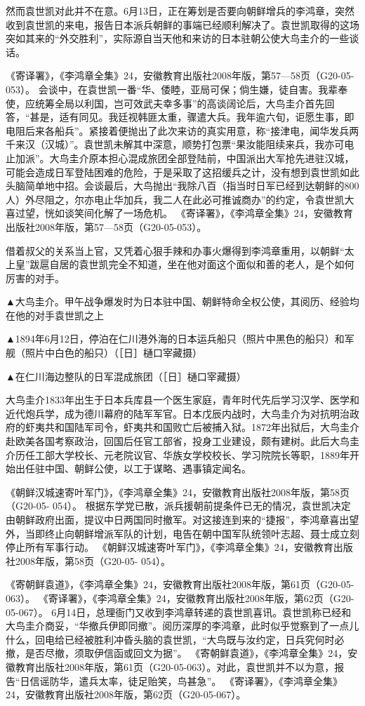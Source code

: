\documentclass[12pt,UTF8]{ctexbook}
\begin{document}
然而袁世凯对此并不在意。6月13日，正在筹划是否要向朝鲜增兵的李鸿章，突然收到袁世凯的来电，报告日本派兵朝鲜的事端已经顺利解决了。袁世凯取得的这场突如其来的“外交胜利”，实际源自当天他和来访的日本驻朝公使大鸟圭介的一些谈话。

《寄译署》，《李鸿章全集》24，安徽教育出版社2008年版，第57—58页（G20-05-053）。
会谈中，在袁世凯一番“华、倭睦，亚局可保；倘生嫌，徒自害。我辈奉使，应统筹全局以利国，岂可效武夫幸多事”的高谈阔论后，大鸟圭介首先回答，“甚是，适有同见。我廷视韩匪太重，骤遣大兵。我年逾六旬，讵愿生事，即电阻后来各船兵”。紧接着便抛出了此次来访的真实用意，称“接津电，闻华发兵两千来汉（汉城）”。袁世凯未解其中深意，顺势打包票“果汝能阻续来兵，我亦可电止加派”。大鸟圭介原本担心混成旅团全部登陆前，中国派出大军抢先进驻汉城，可能会造成日军登陆困难的危险，于是采取了这招缓兵之计，没有想到袁世凯如此头脑简单地中招。会谈最后，大鸟抛出“我除八百（指当时日军已经到达朝鲜的800人）外尽阻之，尔亦电止华加兵，我二人在此必可推诚商办”的约定，令袁世凯大喜过望，恍如谈笑间化解了一场危机。 《寄译署》，《李鸿章全集》24，安徽教育出版社2008年版，第57—58页（G20-05-053）。

借着叔父的关系当上官，又凭着心狠手辣和办事火爆得到李鸿章重用，以朝鲜“太上皇”跋扈自居的袁世凯完全不知道，坐在他对面这个面似和善的老人，是个如何厉害的对手。


▲大鸟圭介。甲午战争爆发时为日本驻中国、朝鲜特命全权公使，其阅历、经验均在他的对手袁世凯之上


▲1894年6月12日，停泊在仁川港外海的日本运兵船只（照片中黑色的船只）和军舰（照片中白色的船只）（［日］樋口宰藏摄）


▲在仁川海边整队的日军混成旅团（［日］樋口宰藏摄）

大鸟圭介1833年出生于日本兵库县一个医生家庭，青年时代先后学习汉学、医学和近代炮兵学，成为德川幕府的陆军军官。日本戊辰内战时，大鸟圭介为对抗明治政府的虾夷共和国陆军司令，虾夷共和国败亡后被捕入狱。1872年出狱后，大鸟圭介赴欧美各国考察政治，回国后任官工部省，投身工业建设，颇有建树。此后大鸟圭介历任工部大学校长、元老院议官、华族女学校校长、学习院院长等职，1889年开始出任驻中国、朝鲜公使，以工于谋略、遇事镇定闻名。

《朝鲜汉城速寄叶军门》，《李鸿章全集》24，安徽教育出版社2008年版，第58页（G20-05- 054）。
根据东学党已散，派兵援朝前提条件已无的情况，袁世凯决定由朝鲜政府出面，提议中日两国同时撤军。对这接连到来的“捷报”，李鸿章喜出望外，当即终止向朝鲜增派军队的计划，电告在朝中国军队统领叶志超、聂士成立刻停止所有军事行动。 《朝鲜汉城速寄叶军门》，《李鸿章全集》24，安徽教育出版社2008年版，第58页（G20-05- 054）。

《寄朝鲜袁道》，《李鸿章全集》24，安徽教育出版社2008年版，第61页（G20-05-063）。
《寄译署》，《李鸿章全集》24，安徽教育出版社2008年版，第62页（G20-05-067）。
6月14日，总理衙门又收到李鸿章转递的袁世凯喜讯。袁世凯称已经和大鸟圭介商妥，“华撤兵伊即同撤”。阅历深厚的李鸿章，此时似乎觉察到了一点儿什么，回电给已经被胜利冲昏头脑的袁世凯，“大鸟既与汝约定，日兵究何时必撤，是否尽撤，须取伊信函或回文为据”。 《寄朝鲜袁道》，《李鸿章全集》24，安徽教育出版社2008年版，第61页（G20-05-063）。对此，袁世凯并不以为意，报告“日信谣防华，遣兵太率，徒足贻笑，鸟甚急”。 《寄译署》，《李鸿章全集》24，安徽教育出版社2008年版，第62页（G20-05-067）。
\end{document}
